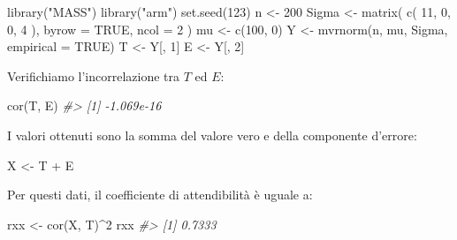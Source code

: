 \documentclass[
  11pt,
]{krantz}
\makeatletter
\newenvironment{Shaded}{\begin{snugshade}}{\end{snugshade}}
\newcommand{\AttributeTok}[1]{\textcolor[rgb]{0.61,0.61,0.61}{#1}}
\newcommand{\CommentTok}[1]{\textcolor[rgb]{0.37,0.37,0.37}{\textit{#1}}}
\newcommand{\ConstantTok}[1]{\textcolor[rgb]{0,0,0}{#1}}
\newcommand{\DecValTok}[1]{\textcolor[rgb]{0.06,0.06,0.06}{#1}}
\newcommand{\FunctionTok}[1]{\textcolor[rgb]{0,0,0}{#1}}
\newcommand{\NormalTok}[1]{#1}
\newcommand{\OtherTok}[1]{\textcolor[rgb]{0.37,0.37,0.37}{#1}}
\newcommand{\SpecialCharTok}[1]{\textcolor[rgb]{0,0,0}{#1}}
\newcommand{\StringTok}[1]{\textcolor[rgb]{0.5,0.5,0.5}{#1}}
\newenvironment{kframe}{%
\medskip{}
\setlength{\fboxsep}{.8em}
 \def\at@end@of@kframe{}%
 \ifinner\ifhmode%
  \def\at@end@of@kframe{\end{minipage}}%
  \begin{minipage}{\columnwidth}%
 \fi\fi%
 \def\FrameCommand##1{\hskip\@totalleftmargin \hskip-\fboxsep
 \colorbox{shadecolor}{##1}\hskip-\fboxsep
     \hskip-\linewidth \hskip-\@totalleftmargin \hskip\columnwidth}%
 \MakeFramed {\advance\hsize-\width
   \@totalleftmargin\z@ \linewidth\hsize
   \@setminipage}}%
 {\par\unskip\endMakeFramed%
 \at@end@of@kframe}
\renewenvironment{Shaded}{\begin{kframe}}{\end{kframe}}
\theoremstyle{definition}
\theoremstyle{definition}
\theoremstyle{definition}
\theoremstyle{definition}
\theoremstyle{remark}
\makeatother
\begin{document}
\begin{Shaded}
\begin{Highlighting}[]
\FunctionTok{library}\NormalTok{(}\StringTok{"MASS"}\NormalTok{)}
\FunctionTok{library}\NormalTok{(}\StringTok{"arm"}\NormalTok{)}
\FunctionTok{set.seed}\NormalTok{(}\DecValTok{123}\NormalTok{)}
\NormalTok{n }\OtherTok{\textless{}{-}} \DecValTok{200}
\NormalTok{Sigma }\OtherTok{\textless{}{-}} \FunctionTok{matrix}\NormalTok{(}
  \FunctionTok{c}\NormalTok{(}
    \DecValTok{11}\NormalTok{, }\DecValTok{0}\NormalTok{,}
    \DecValTok{0}\NormalTok{, }\DecValTok{4}
\NormalTok{  ),}
  \AttributeTok{byrow =} \ConstantTok{TRUE}\NormalTok{, }\AttributeTok{ncol =} \DecValTok{2}
\NormalTok{)}
\NormalTok{mu }\OtherTok{\textless{}{-}} \FunctionTok{c}\NormalTok{(}\DecValTok{100}\NormalTok{, }\DecValTok{0}\NormalTok{)}
\NormalTok{Y }\OtherTok{\textless{}{-}} \FunctionTok{mvrnorm}\NormalTok{(n, mu, Sigma, }\AttributeTok{empirical =} \ConstantTok{TRUE}\NormalTok{)}
\NormalTok{T }\OtherTok{\textless{}{-}}\NormalTok{ Y[, }\DecValTok{1}\NormalTok{]}
\NormalTok{E }\OtherTok{\textless{}{-}}\NormalTok{ Y[, }\DecValTok{2}\NormalTok{]}
\end{Highlighting}
\end{Shaded}

Verifichiamo l'incorrelazione tra \(T\) ed \(E\):

\begin{Shaded}
\begin{Highlighting}[]
\FunctionTok{cor}\NormalTok{(T, E)}
\CommentTok{\#\textgreater{} [1] {-}1.069e{-}16}
\end{Highlighting}
\end{Shaded}

I valori ottenuti sono la somma del valore vero e della componente d'errore:

\begin{Shaded}
\begin{Highlighting}[]
\NormalTok{X }\OtherTok{\textless{}{-}}\NormalTok{ T }\SpecialCharTok{+}\NormalTok{ E}
\end{Highlighting}
\end{Shaded}

Per questi dati, il coefficiente di attendibilità è uguale a:

\begin{Shaded}
\begin{Highlighting}[]
\NormalTok{rxx }\OtherTok{\textless{}{-}} \FunctionTok{cor}\NormalTok{(X, T)}\SpecialCharTok{\^{}}\DecValTok{2}
\NormalTok{rxx}
\CommentTok{\#\textgreater{} [1] 0.7333}
\end{Highlighting}
\end{Shaded}
\end{document}
